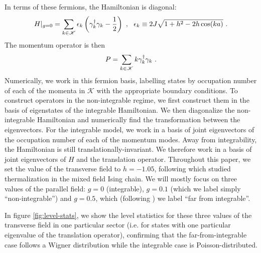 In terms of these fermions, the Hamiltonian is diagonal:
\begin{align}
H|_{g=0}=\sum_{k\in \mathcal{K}} \epsilon_k\left(\gamma^\dagger_k \gamma_k - \frac{1}{2}\right) ~,~~ \epsilon_k\equiv 2J\sqrt{1+h^2-2h\cos(ka)}~. 
\end{align}
The momentum operator is then
\begin{equation}
P=\sum_{k \in \mathcal{K}} k \gamma^\dagger_k \gamma_k~.
\end{equation}
Numerically, we work in this fermion basis, labelling states by occupation number of each of the momenta in $\mathcal{K}$ with the appropriate boundary conditions. To construct operators in the non-integrable regime, we first construct them in the basis of eigenstates of the integrable Hamiltonian. We then diagonalize the non-integrable Hamiltonian and numerically find the transformation between the eigenvectors. For the integrable model, we work in a basis of joint eigenvectors of the occupation number of each of the momentum modes. Away from integrability, the Hamiltonian is still translationally-invariant. We therefore work in a basis of joint eigenvectors of $H$ and the translation operator. 
Throughout this paper, we set the value of the transverse field to $h=-1.05$, following \cite{PhysRevLett.106.050405} which studied thermalization in the mixed field Ising chain. We will mostly focus on three values of the parallel field: $g=0$ (integrable), $g=0.1$ (which we label simply ``non-integrable'') and $g=0.5$, which (following \cite{PhysRevLett.106.050405}) we label ``far from integrable''. 

In figure \ref{fig:level-stats}, we show the level statistics for these three values of the transverse field in one particular sector (i.e. for states with one particular eigenvalue of the translation operator), confirming that the far-from-integrable case follows a Wigner distribution while the integrable case is Poisson-distributed.

